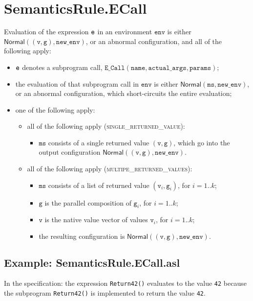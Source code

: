 \documentclass{book}
\newcommand\Normal[0]{\textsf{Normal}}
\newcommand\newenv[0]{\texttt{new\_env}}
\newcommand\env[0]{\texttt{env}}
\newcommand\vg[0]{\texttt{g}}
\newcommand\vv[0]{\texttt{v}}
\newcommand\vms[0]{\texttt{ms}}
\newcommand\name[0]{\texttt{name}}
\newcommand\actualargs[0]{\texttt{actual\_args}}
\newcommand\params[0]{\texttt{params}}
\begin{document}
\section{SemanticsRule.ECall \label{sec:SemanticsRule.ECall}}
  Evaluation of the expression $\texttt{e}$ in an environment $\env$ is either $\Normal((\vv, \vg), \newenv)$,
  or an abnormal configuration, and all of the following apply:
  \begin{itemize}
    \item $\texttt{e}$ denotes a subprogram call, $\texttt{E\_Call}(\name, \actualargs, \params)$;
    \item the evaluation of that subprogram call in $\env$ is either
    $\Normal(\vms, \newenv)$, or an abnormal configuration,
    which short-circuits the entire evaluation;
    \item one of the following apply:
    \begin{itemize}
      \item all of the following apply (\textsc{single\_returned\_value}):
      \begin{itemize}
        \item $\vms$ consists of a single returned value $(\vv,\vg)$,
        which go into the output configuration $\Normal((\vv, \vg), \newenv)$.
      \end{itemize}

      \item all of the following apply (\textsc{multipe\_returned\_values}):
      \begin{itemize}
        \item $\vms$ consists of a list of returned value $(\vv_i,\vg_i)$, for $i=1..k$;
        \item $\vg$ is the parallel composition of $\vg_i$, for $i=1..k$;
        \item $\vv$ is the native value vector of values $\vv_i$, for $i=1..k$;
        \item the resulting configuration is $\Normal((\vv, \vg), \newenv)$.
      \end{itemize}
    \end{itemize}
  \end{itemize}

  \subsection{Example: SemanticsRule.ECall.asl}
    In the specification:
    the expression \texttt{Return42()} evaluates to the value \texttt{42} because the
    subprogram \texttt{Return42()} is implemented to return the value \texttt{42}.
\end{document}
